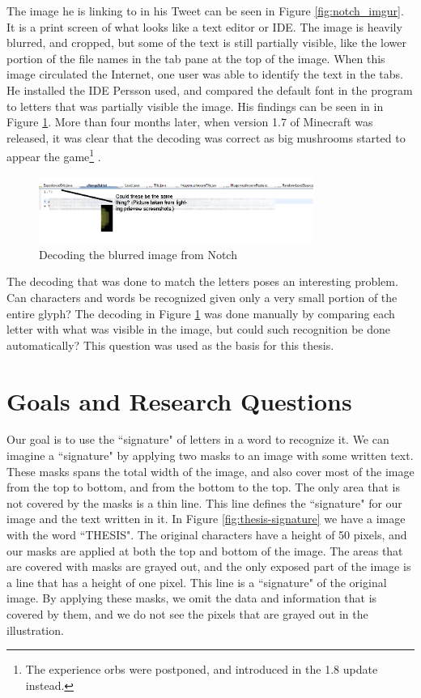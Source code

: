 The image he is linking to in his Tweet can be seen in Figure \ref{fig:notch_imgur}. It is a print screen of what looks like a text editor or IDE. The image is heavily blurred, and cropped, but some of the text is still partially visible, like the lower portion of the file names in the tab pane at the top of the image. When this image circulated the Internet, one user was able to identify the text in the tabs. He installed the IDE Persson used, and compared the default font in the program to letters that was partially visible the image. His findings can be seen in in Figure \ref{fig:notch_eclipse_decoded}. More than four months later, when version 1.7 of Minecraft was released, it was clear that the decoding was correct as big mushrooms started to appear the game\footnote{The experience orbs were postponed, and introduced in the 1.8 update instead.} \citep{misc-minecraft.172-changelog}.

\begin{figure}[ht]
    \centering
    \includegraphics[width=0.8\textwidth]{fig/chapter1/notch_eclipse_decoded.png}
    \caption{Decoding the blurred image from Notch}
    \label{fig:notch_eclipse_decoded}
\end{figure}

\newpage
The decoding that was done to match the letters poses an interesting problem. Can characters and words be recognized given only a very small portion of the entire glyph? The decoding in Figure \ref{fig:notch_eclipse_decoded} was done manually by comparing each letter with what was visible in the image, but could such recognition be done automatically? This question was used as the basis for this thesis.


\section{Goals and Research Questions}
\label{sec:goals_and_research_questions}
Our goal is to use the ``signature" of letters in a word to recognize it. We can imagine a ``signature" by applying two masks to an image with some written text. These masks spans the total width of the image, and also cover most of the image from the top to bottom, and from the bottom to the top. The only area that is not covered by the masks is a thin line. This line defines the ``signature" for our image and the text written in it. In Figure \ref{fig:thesis-signature} we have a image with the word ``THESIS". The original characters have a height of 50 pixels, and our masks are applied at both the top and bottom of the image. The areas that are covered with masks are grayed out, and the only exposed part of the image is a line that has a height of one pixel. This line is a ``signature" of the original image. By applying these masks, we omit the data and information that is covered by them, and we do not see the pixels that are grayed out in the illustration.

